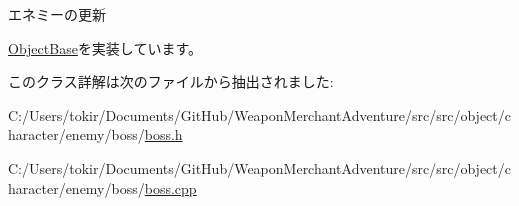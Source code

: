 エネミーの更新 



\mbox{\hyperlink{class_object_base_a8b5b72b363a419767efde0b0e692ea95}{Object\+Base}}を実装しています。



このクラス詳解は次のファイルから抽出されました\+:\begin{DoxyCompactItemize}
\item 
C\+:/\+Users/tokir/\+Documents/\+Git\+Hub/\+Weapon\+Merchant\+Adventure/src/src/object/character/enemy/boss/\mbox{\hyperlink{boss_8h}{boss.\+h}}\item 
C\+:/\+Users/tokir/\+Documents/\+Git\+Hub/\+Weapon\+Merchant\+Adventure/src/src/object/character/enemy/boss/\mbox{\hyperlink{boss_8cpp}{boss.\+cpp}}\end{DoxyCompactItemize}
